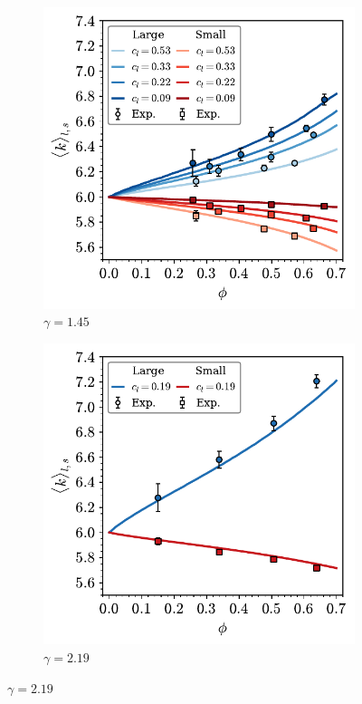 \begin{figure}[bt]
     \centering
     
      \begin{subfigure}[b]{0.45\textwidth}
         \centering
         \includegraphics[width=\textwidth]{./figures/quasi2d/bi_ssr_phi_k.pdf}
         \caption{$\gamma=1.45$}
         \label{fig:bi1}
     \end{subfigure}
     \hfill
      \begin{subfigure}[b]{0.45\textwidth}
         \centering
         \includegraphics[width=\textwidth]{./figures/quasi2d/bi_lsr_phi_k.pdf}
         \caption{$\gamma=2.19$}
         \label{fig:bi2}
     \end{subfigure}
     \hfill
     

\end{figure}
